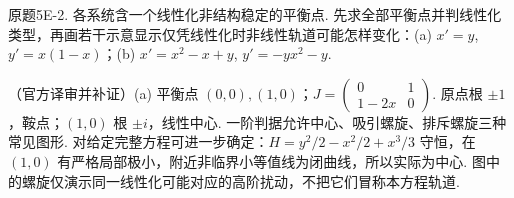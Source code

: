 \begin{exercise}\label{cw:bank-5E-2}原题5E-2. 各系统含一个线性化非结构稳定的平衡点. 先求全部平衡点并判线性化类型，再画若干示意显示仅凭线性化时非线性轨道可能怎样变化：(a) $x'=y$, $y'=x(1-x)$；(b) $x'=x^2-x+y$, $y'=-yx^2-y$.\end{exercise}
\begin{solution}（官方译审并补证）(a) 平衡点 $(0,0),(1,0)$；$J=\begin{pmatrix}0&1\\1-2x&0\end{pmatrix}$. 原点根 $\pm1$，鞍点；$(1,0)$ 根 $\pm i$，线性中心. 一阶判据允许中心、吸引螺旋、排斥螺旋三种常见图形. 对给定完整方程可进一步确定：$H=y^2/2-x^2/2+x^3/3$ 守恒，在 $(1,0)$ 有严格局部极小，附近非临界小等值线为闭曲线，所以实际为中心. 图中的螺旋仅演示同一线性化可能对应的高阶扰动，不把它们冒称本方程轨道.


\end{solution}
